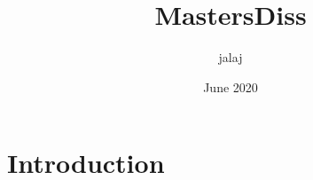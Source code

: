 \documentclass{article}
\title{MastersDiss}
\author{jalaj }
\date{June 2020}
\begin{document}
\maketitle

\section{Introduction}
\end{document}
